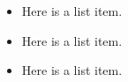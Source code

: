 \documentclass{article}
\begin{document}

\begin{itemize}
\item Here is a list item.
\item Here is a list item.
\item Here is a list item.
\end{itemize}
\end{document}
